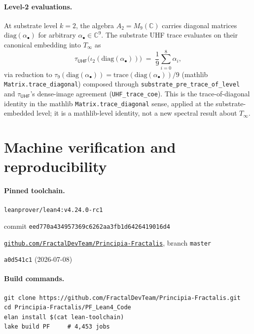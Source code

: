 \documentclass[11pt,a4paper]{amsart}
\theoremstyle{plain}
\theoremstyle{definition}
\begin{document}
\paragraph{Level-2 evaluations.} At substrate level $k = 2$, the algebra $A_2 = M_9(\mathbb{C})$ carries diagonal matrices $\mathrm{diag}(\alpha_\bullet)$ for arbitrary $\alpha_\bullet \in \mathbb{C}^9$. The substrate UHF trace evaluates on their canonical embedding into $T_\infty$ as
\[
\tau_{\textsf{UHF}}\bigl(\iota_2(\mathrm{diag}(\alpha_\bullet))\bigr) \;=\; \frac{1}{9} \sum_{i=0}^{8} \alpha_i,
\]
via reduction to $\tau_9(\mathrm{diag}(\alpha_\bullet)) = \mathrm{trace}(\mathrm{diag}(\alpha_\bullet))/9$ (mathlib \texttt{Matrix.trace\_diagonal}) composed through \texttt{substrate\_pre\_trace\_of\_level} and $\tau_{\textsf{UHF}}$'s dense-image agreement (\texttt{UHF\_trace\_coe}). This is the trace-of-diagonal identity in the mathlib \texttt{Matrix.trace\_diagonal} sense, applied at the substrate-embedded level; it is a mathlib-level identity, not a new spectral result about $T_\infty$.

\section{Machine verification and reproducibility}\label{sec:reproducibility}

\paragraph{Pinned toolchain.}
\begin{description}[font=\normalfont\bfseries,leftmargin=2em,itemsep=2pt]
\item[Lean toolchain] \texttt{leanprover/lean4:v4.24.0-rc1}
\item[mathlib revision] commit \texttt{eed770a434957369c6262aa3fb1d6426419016d4}
\item[Repository] \href{https://github.com/FractalDevTeam/Principia-Fractalis}{\texttt{github.com/FractalDevTeam/Principia-Fractalis}}, branch \texttt{master}
\item[HEAD reference at submission] \texttt{a0d541c1} (2026-07-08)
\end{description}

\paragraph{Build commands.}
\begin{verbatim}
git clone https://github.com/FractalDevTeam/Principia-Fractalis.git
cd Principia-Fractalis/PF_Lean4_Code
elan install $(cat lean-toolchain)
lake build PF     # 4,453 jobs
\end{verbatim}
\end{document}
